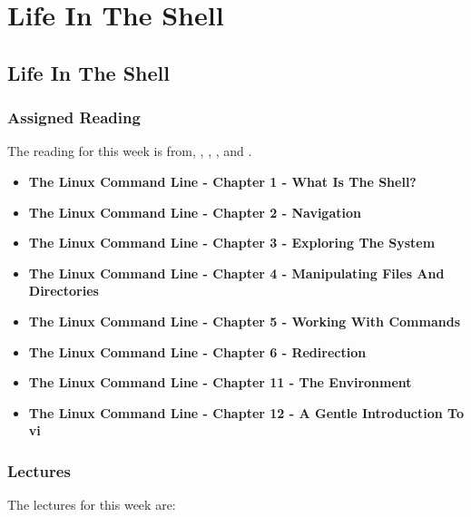 \clearpage

\newcommand{\ChapTitle}{Life In The Shell}
\newcommand{\SectionTitle}{Life In The Shell}

\chapter{\ChapTitle}

\section{\SectionTitle}

\subsection{Assigned Reading}

The reading for this week is from, \AgileBook, \EngSoftBook, \ProGitBook, and \LinuxBook.

\begin{itemize}
    \item \textbf{The Linux Command Line - Chapter 1 - What Is The Shell?}
    \item \textbf{The Linux Command Line - Chapter 2 - Navigation}
    \item \textbf{The Linux Command Line - Chapter 3 - Exploring The System}
    \item \textbf{The Linux Command Line - Chapter 4 - Manipulating Files And Directories}
    \item \textbf{The Linux Command Line - Chapter 5 - Working With Commands}
    \item \textbf{The Linux Command Line - Chapter 6 - Redirection}
    \item \textbf{The Linux Command Line - Chapter 11 - The Environment}
    \item \textbf{The Linux Command Line - Chapter 12 - A Gentle Introduction To vi}
\end{itemize}

\subsection{Lectures}

The lectures for this week are:

